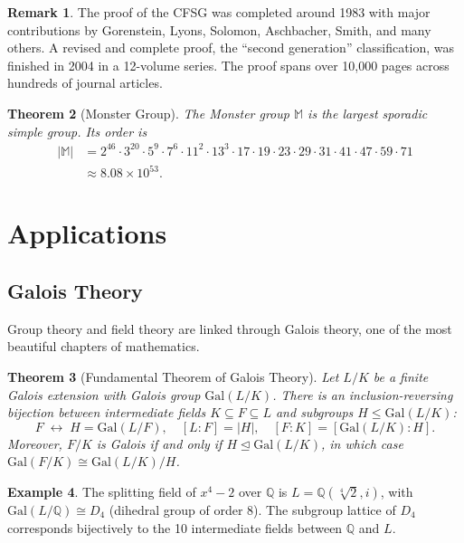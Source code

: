 \documentclass[12pt,a4paper]{amsart}
\newtheorem{theorem}{Theorem}[section]
\theoremstyle{definition}
\newtheorem{example}[theorem]{Example}
\newtheorem{remark}[theorem]{Remark}
\begin{document}
\begin{remark}
The proof of the CFSG was completed around 1983 with major contributions by Gorenstein,
Lyons, Solomon, Aschbacher, Smith, and many others. A revised and complete proof,
the ``second generation'' classification, was finished in 2004 in a 12-volume series.
The proof spans over 10,000 pages across hundreds of journal articles.
\end{remark}

\begin{theorem}[Monster Group]
The \emph{Monster group} $\mathbb{M}$ is the largest sporadic simple group. Its order is
\begin{align*}
  |\mathbb{M}| &= 2^{46} \cdot 3^{20} \cdot 5^9 \cdot 7^6 \cdot 11^2 \cdot 13^3
                  \cdot 17 \cdot 19 \cdot 23 \cdot 29 \cdot 31 \cdot 41 \cdot 47
                  \cdot 59 \cdot 71\\
               &\approx 8.08 \times 10^{53}.
\end{align*}
\end{theorem}

\section{Applications}
\label{sec:applications}

\subsection{Galois Theory}

Group theory and field theory are linked through Galois theory, one of the most beautiful
chapters of mathematics.

\begin{theorem}[Fundamental Theorem of Galois Theory]
\label{thm:galois_fund}
Let $L/K$ be a finite Galois extension with Galois group $\mathrm{Gal}(L/K)$. There
is an inclusion-reversing bijection between intermediate fields $K \subseteq F \subseteq L$
and subgroups $H \leq \mathrm{Gal}(L/K)$:
\[
  F \;\longleftrightarrow\; H = \mathrm{Gal}(L/F), \quad
  [L : F] = |H|, \quad [F : K] = [\mathrm{Gal}(L/K) : H].
\]
Moreover, $F/K$ is Galois if and only if $H \trianglelefteq \mathrm{Gal}(L/K)$, in
which case $\mathrm{Gal}(F/K) \cong \mathrm{Gal}(L/K)/H$.
\end{theorem}

\begin{example}
The splitting field of $x^4 - 2$ over $\mathbb{Q}$ is $L = \mathbb{Q}(\sqrt[4]{2},i)$,
with $\mathrm{Gal}(L/\mathbb{Q}) \cong D_4$ (dihedral group of order 8). The subgroup
lattice of $D_4$ corresponds bijectively to the 10 intermediate fields between
$\mathbb{Q}$ and $L$.
\end{example}
\end{document}
